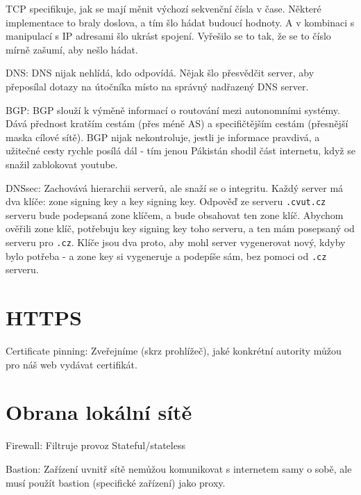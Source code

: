 TCP specifikuje, jak se mají měnit výchozí sekvenční čísla v čase. Některé implementace to braly doslova, a tím šlo hádat budoucí hodnoty. A v kombinaci s manipulací s IP adresami šlo ukrást spojení. Vyřešilo se to tak, že se to číslo mírně zašumí, aby nešlo hádat.

DNS: DNS nijak nehlídá, kdo odpovídá. Nějak šlo přesvědčit server, aby přeposílal dotazy na útočníka místo na správný nadřazený DNS server.

BGP: BGP slouží k výměně informací o routování mezi autonomními systémy. Dává přednost kratším cestám (přes méně AS) a specifičtějším cestám (přesnější maska cílové sítě). BGP nijak nekontroluje, jestli je informace pravdivá, a užitečné cesty rychle posílá dál - tím jenou Pákistán shodil část internetu, když se snažil zablokovat youtube.

DNSsec: Zachovává hierarchii serverů, ale snaží se o integritu. Každý server má dva klíče: zone signing key a key signing key. Odpověď ze serveru \texttt{.cvut.cz} serveru bude podepsaná zone klíčem, a bude obsahovat ten zone klíč. Abychom ověřili zone klíč, potřebuju key signing key toho serveru, a ten mám posepsaný od serveru pro \texttt{.cz}. Klíče jsou dva proto, aby mohl server vygenerovat nový, kdyby bylo potřeba - a zone key si vygeneruje a podepíše sám, bez pomoci od \texttt{.cz} serveru.



\section{HTTPS}

Certificate pinning: Zveřejníme (skrz prohlížeč), jaké konkrétní autority můžou pro náš web vydávat certifikát.



\section{Obrana lokální sítě}

Firewall: Filtruje provoz Stateful/stateless

Bastion: Zařízení uvnitř sítě nemůžou komunikovat s internetem samy o sobě, ale musí použít bastion (specifické zařízení) jako proxy.	 		







